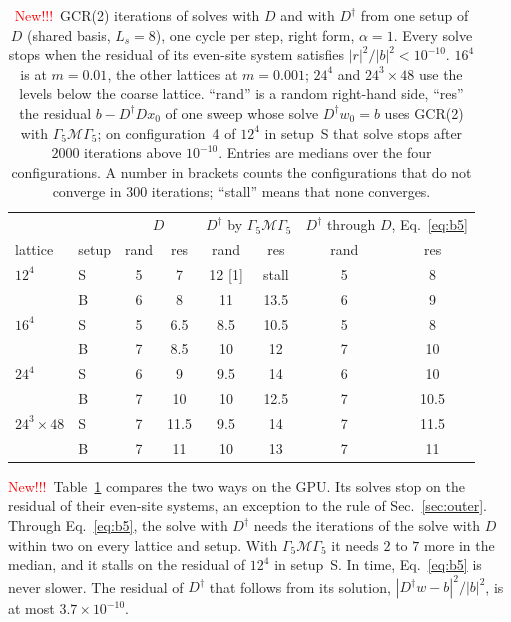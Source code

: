 \documentclass[11pt,a4paper]{article}
\newif\ifshownew \shownewtrue
\DeclareRobustCommand\New{\ifshownew\textcolor{red}{New!!!}\ \else\ignorespaces\fi}
\numberwithin{equation}{section}
\newcommand{\dg}{^{\dagger}}
\newcommand{\Gfive}{\Gamma_5}
\begin{document}
\begin{table}[t]
\centering
\caption{\New GCR(2) iterations of solves with $D$ and with $D\dg$ from one setup of $D$ (shared basis,
$L_s=8$), one cycle per step,
right form, $\alpha=1$. Every solve stops when the residual of its even-site system satisfies
$|r|^2/|b|^2<10^{-10}$. $16^4$ is at $m=0.01$, the other lattices at $m=0.001$; $24^4$ and
$24^3\times48$ use the levels below the coarse lattice. ``rand'' is a random right-hand side, ``res''
the residual $b-D\dg Dx_0$ of one sweep whose solve $D\dg w_0=b$ uses GCR(2) with
$\Gfive\mathcal M\Gfive$; on configuration~4 of $12^4$ in setup~S that solve stops after $2000$
iterations above $10^{-10}$. Entries are medians over the four configurations. A number in
brackets counts the configurations that do not converge in $300$ iterations; ``stall'' means that
none converges.}
\label{tab:b5}
\renewcommand{\arraystretch}{1.15}
\begin{tabular}{@{}llcccccc@{}}
\toprule
 & & \multicolumn{2}{c}{$D$} & \multicolumn{2}{c}{$D\dg$ by $\Gfive\mathcal M\Gfive$} & \multicolumn{2}{c}{$D\dg$ through $D$, Eq.~\eqref{eq:b5}}\\
lattice & setup & rand & res & rand & res & rand & res\\
\midrule
$12^4$ & S & 5 & 7 & 12 [1] & stall & 5 & 8\\
 & B & 6 & 8 & 11 & 13.5 & 6 & 9\\
$16^4$ & S & 5 & 6.5 & 8.5 & 10.5 & 5 & 8\\
 & B & 7 & 8.5 & 10 & 12 & 7 & 10\\
$24^4$ & S & 6 & 9 & 9.5 & 14 & 6 & 10\\
 & B & 7 & 10 & 10 & 12.5 & 7 & 10.5\\
$24^3\times48$ & S & 7 & 11.5 & 9.5 & 14 & 7 & 11.5\\
 & B & 7 & 11 & 10 & 13 & 7 & 11\\
\bottomrule
\end{tabular}
\end{table}

\New Table~\ref{tab:b5} compares the two ways on the GPU. Its solves stop on the residual of
their even-site systems, an exception to the rule of Sec.~\ref{sec:outer}. Through
Eq.~\eqref{eq:b5}, the solve with $D\dg$ needs the iterations of the solve with $D$ within two on every
lattice and setup. With $\Gfive\mathcal M\Gfive$ it needs $2$ to $7$ more in the median, and it
stalls on the residual of $12^4$ in setup~S. In time, Eq.~\eqref{eq:b5} is never slower. The
residual of $D\dg$ that follows from its solution, $|D\dg w-b|^2/|b|^2$, is at most
$3.7\times10^{-10}$.
\end{document}
